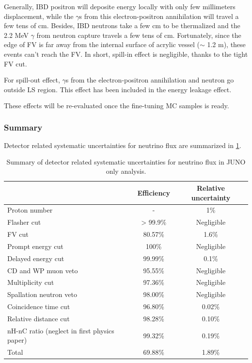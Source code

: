 Generally, IBD positron will deposite energy locally with only few millimeters displacement, while the $\gamma$s from this electron-positron annihilation will travel a few tens of cm. Besides, IBD neutrons take a few cm to be thermalized and the 2.2 MeV $\gamma$ from neutron capture travels a few tens of cm. Fortunately, since the edge of FV is far away from the internal surface of acrylic vessel ($\sim$ 1.2 m), these events can't reach the FV.
In short, spill-in effect is negligible, thanks to the tight FV cut.

For spill-out effect, $\gamma$s from the electron-positron annihilation and neutron go outside LS region. This effect has been included in the energy leakage effect.

These effects will be re-evaluated once the fine-tuning MC samples is ready.


\subsubsection{Summary}
Detector related systematic uncertainties for neutrino flux are summarized in \ref{tab:DetErr}.

\begin{table}[!htbp]
    \caption{Summary of detector related systematic uncertainties for neutrino flux in JUNO only analysis.}
    \label{tab:DetErr}
    \centering
    \footnotesize%
    \setlength{\tabcolsep}{4pt}%
    \renewcommand{\arraystretch}{1.2}%
    \begin{tabular}{lcc}
        \hline
         & Efficiency & Relative uncertainty \\ 
        \hline
        Proton number & - & 1\% \\
        Flasher cut & > 99.9\% & Negligible \\
        FV cut & 80.57\% & 1.6\% \\ 
        Prompt energy cut & 100\% & Negligible \\
        Delayed energy cut & 99.99\% & 0.1\% \\
        CD and WP muon veto & 95.55\% & Negligible \\
        Multiplicity cut & 97.36\% & Negligible \\
        Spallation neutron veto & 98.00\% & Negligible \\
        Coincidence time cut  & 96.80\% & 0.02\% \\
        Relative distance cut & 98.28\% & 0.10\% \\
        nH-nC ratio (neglect in first physics paper) & 99.32\% & 0.19\% \\
        \hline
        Total & 69.88\% & 1.89\% \\
        \hline
    \end{tabular}
\end{table}



